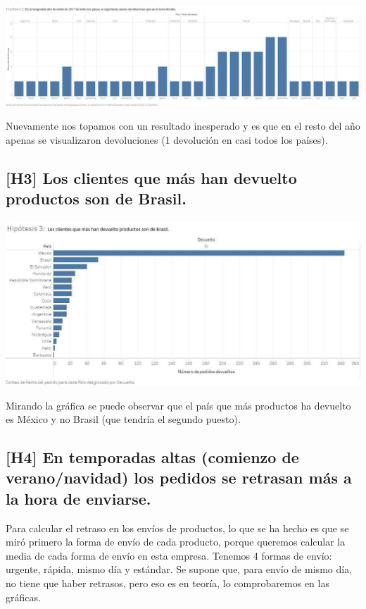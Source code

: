 \documentclass{article}
\begin{document}
\begin{flushleft}
\includegraphics[scale=0.4]{imagenes/Hipotesis2_2.jpg} 
\end{flushleft}

Nuevamente nos topamos con un resultado inesperado y es que en el resto del año apenas se visualizaron devoluciones (1 devolución en casi todos los países).

\subsection{[H3] Los clientes que más han devuelto productos son de Brasil.}

\begin{center}
\includegraphics[scale=0.5]{imagenes/Hipotesis3.jpg} 
\end{center}

Mirando la gráfica se puede observar que el país que más productos ha devuelto es México y no Brasil (que tendría el segundo puesto).  

\subsection{[H4] En temporadas altas (comienzo de verano/navidad) los pedidos se retrasan más a la hora de enviarse.}

Para calcular el retraso en los envíos de productos, lo que se ha hecho es que se miró primero la forma de envío de cada producto, porque queremos calcular la media de cada forma de envío en esta empresa. Tenemos 4 formas de envío: urgente, rápida, mismo día y estándar. Se supone que, para envío de mismo día, no tiene que haber retrasos, pero eso es en teoría, lo comprobaremos en las gráficas. 
\end{document}
